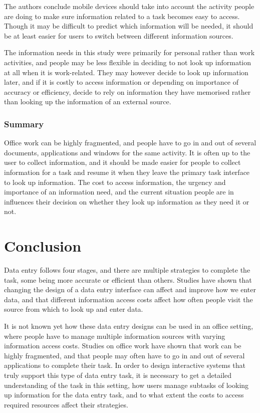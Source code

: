 \documentclass[11pt,oneside]{report}
\begin{document}
The authors conclude mobile devices should take into account the activity people are doing to make sure information related to a task becomes easy to access. Though it may be difficult to predict which information will be needed, it should be at least easier for users to switch between different information sources.

The information needs in this study were primarily for personal rather than work activities, and people may be less flexible in deciding to not look up information at all when it is work-related. They may however decide to look up information later, and if it is costly to access information or depending on importance of accuracy or efficiency, decide to rely on information they have memorised rather than looking up the information of an external source. 

\subsubsection{Summary}
Office work can be highly fragmented, and people have to go in and out of several documents, applications and windows for the same activity. It is often up to the user to collect information, and it should be made easier for people to collect information for a task and resume it when they leave the primary task interface to look up information. The cost to access information, the urgency and importance of an information need, and the current situation people are in influences their decision on whether they look up information as they need it or not. 

\section{Conclusion}
Data entry follows four stages, and there are multiple strategies to complete the task, some being more accurate or efficient than others. Studies have shown that changing the design of a data entry interface can affect and improve how we enter data, and that different information access costs affect how often people visit the source from which to look up and enter data.

It is not known yet how these data entry designs can be used in an office setting, where people have to manage multiple information sources with varying information access costs. Studies on office work have shown that work can be highly fragmented, and that people may often have to go in and out of several applications to complete their task. 
In order to design interactive systems that truly support this type of data entry task, it is necessary to get a detailed understanding of the task in this setting, how users manage subtasks of looking up information for the data entry task, and to what extent the costs to access required resources affect their strategies.
\end{document}
